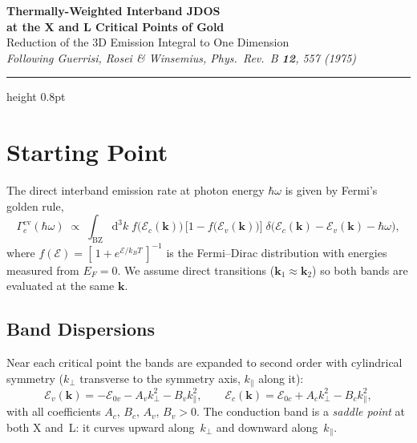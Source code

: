 \documentclass[11pt,a4paper]{article}
\newcommand{\E}{\mathcal{E}}              %
\newcommand{\Ec}{\E_c}
\newcommand{\Ev}{\E_v}
\newcommand{\Eoc}{\E_{0c}}
\newcommand{\Eov}{\E_{0v}}
\newcommand{\kperp}{k_{\!\perp}}
\newcommand{\kpar}{k_{\!\parallel}}
\newcommand{\hw}{\hbar\omega}
\newcommand{\dd}{\mathrm{d}}
\begin{document}
\begin{center}
  {\LARGE\bfseries Thermally-Weighted Interband JDOS \\[4pt]
    at the X and L Critical Points of Gold}\\[12pt]
  {\large Reduction of the 3D Emission Integral to One Dimension}\\[8pt]
  {\itshape Following Guerrisi, Rosei \& Winsemius, Phys.\ Rev.\ B \textbf{12}, 557 (1975)}
\end{center}
\vspace{6pt}
\hrule height 0.8pt
\vspace{10pt}

\section{Starting Point}

The direct interband emission rate at photon energy $\hw$ is given by Fermi's golden rule,
\begin{equation}\label{eq:golden}
  \Gamma_{e}^{\mathrm{cv}}(\hw)
  \;\propto\;
  \int_{\mathrm{BZ}} \dd^{3}k \;
  f\!\bigl(\Ec(\mathbf{k})\bigr)\,
  \bigl[1-f\!\bigl(\Ev(\mathbf{k})\bigr)\bigr]\;
  \delta\!\bigl(\Ec(\mathbf{k}) - \Ev(\mathbf{k}) - \hw\bigr),
\end{equation}
where $f(\E)=[\,1+e^{\E/k_BT}\,]^{-1}$ is the Fermi--Dirac distribution with energies measured from $E_F=0$. We assume direct transitions ($\mathbf{k}_1 \approx \mathbf{k}_2$) so both bands are evaluated at the same $\mathbf{k}$.

\subsection{Band Dispersions}

Near each critical point the bands are expanded to second order with cylindrical symmetry ($\kperp$ transverse to the symmetry axis, $\kpar$ along it):
\begin{equation}\label{eq:bands}
  \boxed{\;
  \Ev(\mathbf{k}) = -\Eov - A_v\kperp^2 - B_v\kpar^2,
  \qquad
  \Ec(\mathbf{k}) = \Eoc + A_c\kperp^2 - B_c\kpar^2,
  \;}
\end{equation}
with all coefficients $A_c,\,B_c,\,A_v,\,B_v > 0$. The conduction band is a \emph{saddle point} at both X and~L: it curves upward along~$\kperp$ and downward along~$\kpar$.
\end{document}
